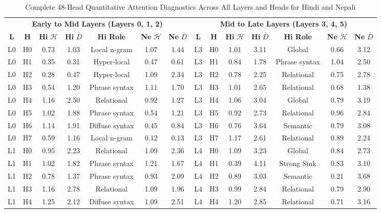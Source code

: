 \documentclass[10pt,a4paper]{article}
\begin{document}
\begin{table}[htbp]
\centering
\scriptsize
\setlength{\tabcolsep}{2.0pt}
\caption{Complete 48-Head Quantitative Attention Diagnostics Across All Layers and Heads for Hindi and Nepali}
\label{tab:all_48_heads}
\begin{tabular}{ccccccc|ccccccc}
\toprule
\multicolumn{7}{c|}{\textbf{Early to Mid Layers (Layers 0, 1, 2)}} & \multicolumn{7}{c}{\textbf{Mid to Late Layers (Layers 3, 4, 5)}} \\
\textbf{L} & \textbf{H} & \textbf{Hi }$\mathcal{H}$ & \textbf{Hi }$\bar{D}$ & \textbf{Hi Role} & \textbf{Ne }$\mathcal{H}$ & \textbf{Ne }$\bar{D}$ & \textbf{L} & \textbf{H} & \textbf{Hi }$\mathcal{H}$ & \textbf{Hi }$\bar{D}$ & \textbf{Hi Role} & \textbf{Ne }$\mathcal{H}$ & \textbf{Ne }$\bar{D}$ \\
\midrule
L0 & H0 & 0.73 & 1.03 & Local n-gram & 1.07 & 1.44 & L3 & H0 & 1.01 & 3.11 & Global & 0.66 & 3.12 \\
L0 & H1 & 0.35 & 0.31 & Hyper-local & 0.47 & 0.61 & L3 & H1 & 0.84 & 1.78 & Phrase syntax & 1.04 & 2.50 \\
L0 & H2 & 0.28 & 0.47 & Hyper-local & 1.09 & 2.34 & L3 & H2 & 0.78 & 2.25 & Relational & 0.75 & 2.78 \\
L0 & H3 & 0.54 & 1.20 & Phrase syntax & 1.11 & 1.70 & L3 & H3 & 1.01 & 2.65 & Relational & 0.68 & 1.38 \\
L0 & H4 & 1.16 & 2.50 & Relational & 0.92 & 1.27 & L3 & H4 & 1.06 & 3.04 & Global & 0.79 & 3.19 \\
L0 & H5 & 1.02 & 1.88 & Phrase syntax & 0.54 & 1.21 & L3 & H5 & 0.92 & 2.73 & Relational & 0.96 & 2.84 \\
L0 & H6 & 1.14 & 1.91 & Diffuse syntax & 0.45 & 0.84 & L3 & H6 & 0.76 & 3.64 & Semantic & 0.79 & 3.08 \\
L0 & H7 & 0.59 & 1.16 & Local n-gram & 0.12 & 0.13 & L3 & H7 & 1.17 & 2.61 & Relational & 0.89 & 2.24 \\
\midrule
L1 & H0 & 0.95 & 2.23 & Relational & 1.09 & 2.36 & L4 & H0 & 1.09 & 3.23 & Global & 0.84 & 2.73 \\
L1 & H1 & 1.02 & 1.82 & Phrase syntax & 1.21 & 1.67 & L4 & H1 & 0.39 & 4.11 & Strong Sink & 0.83 & 3.10 \\
L1 & H2 & 0.78 & 1.37 & Phrase syntax & 0.93 & 2.09 & L4 & H2 & 0.89 & 3.03 & Semantic & 0.21 & 3.68 \\
L1 & H3 & 1.16 & 2.78 & Relational & 1.09 & 1.96 & L4 & H3 & 0.99 & 2.84 & Relational & 0.79 & 2.90 \\
L1 & H4 & 1.25 & 2.12 & Diffuse syntax & 1.09 & 2.51 & L4 & H4 & 1.20 & 2.85 & Relational & 0.71 & 3.16 \\

\end{tabular}
\end{table}
\end{document}
